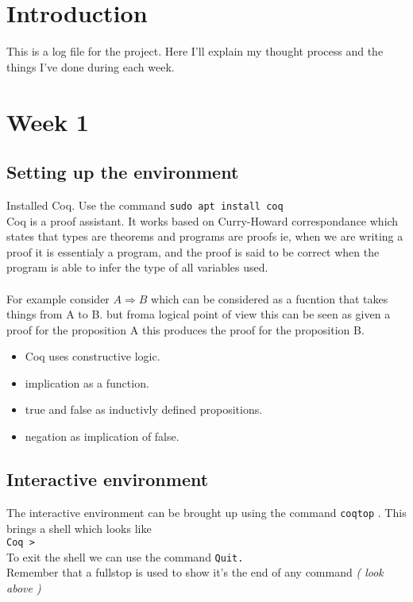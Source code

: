 \documentclass[twocolumn]{book}
\begin{document}
\section{Introduction}
This is a log file for the project. Here I'll explain my thought process and the things I've done during each week.
\section{Week 1}
\subsection{Setting up the environment}
Installed Coq. Use the command \verb|sudo apt install coq|\\
Coq is a proof assistant. It works based on Curry-Howard correspondance which states that types are theorems and programs are proofs ie, when we are writing a proof it is essentialy a program, and the proof is said to be correct when the program is able to infer the type of all variables used. \\ \\
For example consider $ A \Longrightarrow B $ which can be considered as a fucntion that takes things from A to B. but froma  logical point of view this can be seen as given a proof for the proposition A this produces the proof for the proposition B.
\begin{itemize}
\item Coq uses constructive logic.
\item implication as a function.
\item true and false as inductivly defined propositions.
  \item negation as implication of false.
  \end{itemize}
\subsection{Interactive environment}
 
The interactive environment can be brought up using the command \verb|coqtop| . This brings a shell which looks like\\
\verb|Coq > | \\
To exit the shell we can use the command \verb|Quit.| \\
Remember that a fullstop is used to show it's the end of any command \textit{ ( look above ) }
\end{document}
